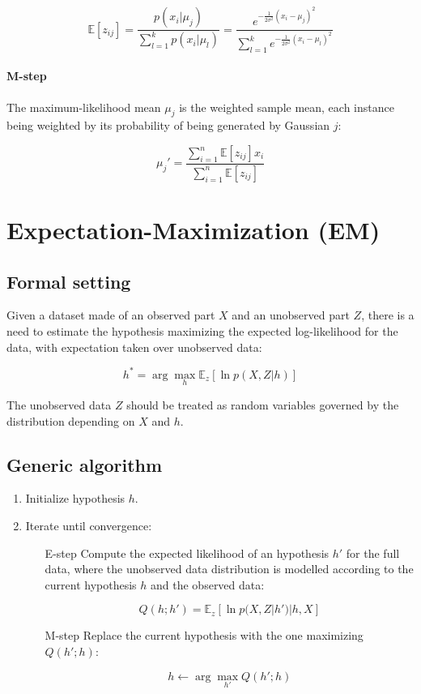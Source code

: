 			$$\mathbb{E}[z_{ij}] = \frac{p(x_i|\mu_j)}{\sum\limits_{l=1}^kp(x_i|\mu_l)} = \frac{e^{-\frac{1}{2\sigma^2}(x_i-\mu_j)^2}}{\sum\limits_{l=1}^k e^{-\frac{1}{2\sigma^2}(x_i-\mu_l)^2}}$$

			\paragraph{M-step}
			The maximum-likelihood mean $\mu_j$ is the weighted sample mean, each instance being weighted by its probability of being generated by Gaussian $j$:

			$$\mu_j' = \frac{\sum\limits_{i=1}^n\mathbb{E}[z_{ij}]x_i}{\sum\limits_{i=1}^n\mathbb{E}[z_{ij}]}$$

\section{Expectation-Maximization (EM)}

	\subsection{Formal setting}
	Given a dataset made of an observed part $X$ and an unobserved part $Z$, there is a need to estimate the hypothesis maximizing the expected log-likelihood for the data, with expectation taken over unobserved data:

	$$h^* = \arg\max\limits_{h}\mathbb{E}_z[\ln p(X,Z|h)]$$

	The  unobserved data $Z$ should be treated as random variables governed by the distribution depending on $X$ and $h$.

	\subsection{Generic algorithm}

	\begin{enumerate}
		\item Initialize hypothesis $h$.
		\item Iterate until convergence:

			\begin{itemize}
				\item[E-step] Compute the expected likelihood of an hypothesis $h'$ for the full data, where the unobserved data distribution is modelled according to the current hypothesis $h$ and the observed data:

					$$Q(h;h') = \mathbb{E}_z[\ln p(X,Z|h')|h,X]$$

				\item[M-step] Replace the current hypothesis with the one maximizing $Q(h';h)$:

					$$h\leftarrow\arg\max\limits_{h'}Q(h';h)$$
			\end{itemize}
	\end{enumerate}

